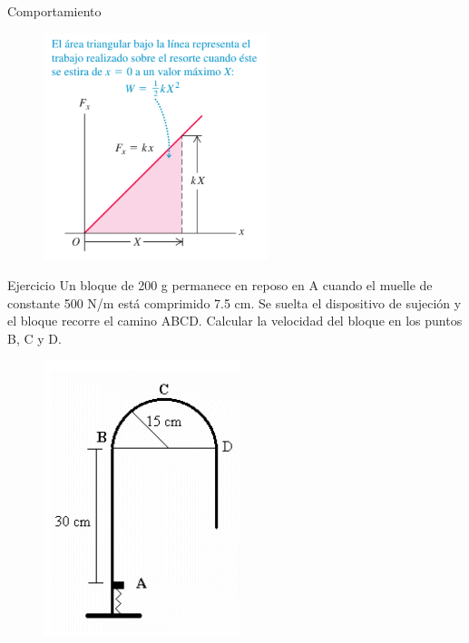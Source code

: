 \begin{frame}{Comportamiento}
    \begin{figure}
        \centering
        \includegraphics[width=0.5\linewidth]{figures/hooke-law.png}
    \end{figure}
\end{frame}

\begin{frame}{Ejercicio}
        Un bloque de 200 g permanece en reposo en A cuando el muelle de constante 500 N/m está comprimido 7.5 cm. Se suelta el dispositivo de sujeción y el bloque recorre el camino ABCD. Calcular la velocidad del bloque en los puntos B, C y D.
        \begin{figure}
            \centering
            \includegraphics[width=0.25\linewidth]{figures/resorte-curva1.png}
        \end{figure}
    \end{frame}


